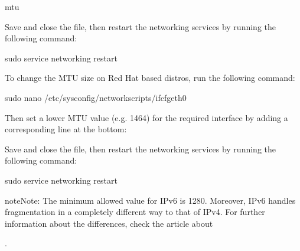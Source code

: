 \documentclass[a4paper,10pt,english,openany,oneside]{sphinxmanual}
\begin{document}
\begin{sphinxVerbatim}[commandchars=\\\{\}]
mtu 
\end{sphinxVerbatim}

\sphinxAtStartPar
Save and close the file, then restart the networking services by running the following command:

\begin{sphinxVerbatim}[commandchars=\\\{\}]
sudo service networking restart
\end{sphinxVerbatim}

\sphinxAtStartPar
To change the MTU size on Red Hat based distros, run the following command:

\begin{sphinxVerbatim}[commandchars=\\\{\}]
sudo nano /etc/sysconfig/network\PYGZhy{}scripts/ifcfg\PYGZhy{}eth0
\end{sphinxVerbatim}

\sphinxAtStartPar
Then set a lower MTU value (e.g. 1464) for the required interface by adding a corresponding line at the bottom:

\begin{sphinxVerbatim}[commandchars=\\\{\}]
\end{sphinxVerbatim}

\sphinxAtStartPar
Save and close the file, then restart the networking services by running the following command:

\begin{sphinxVerbatim}[commandchars=\\\{\}]
sudo service networking restart
\end{sphinxVerbatim}

\begin{sphinxadmonition}{note}{Note:}
\sphinxAtStartPar
The minimum allowed value for IPv6 is 1280. Moreover, IPv6 handles fragmentation in a completely different way to that of IPv4. For further information about the differences, check the article about %
\begin{footnote}[19]\sphinxAtStartFootnote
{}
%
\end{footnote}.
\end{sphinxadmonition}



\renewcommand{\indexname}{Index}
\footnotesize\raggedright\printindex
\end{document}
